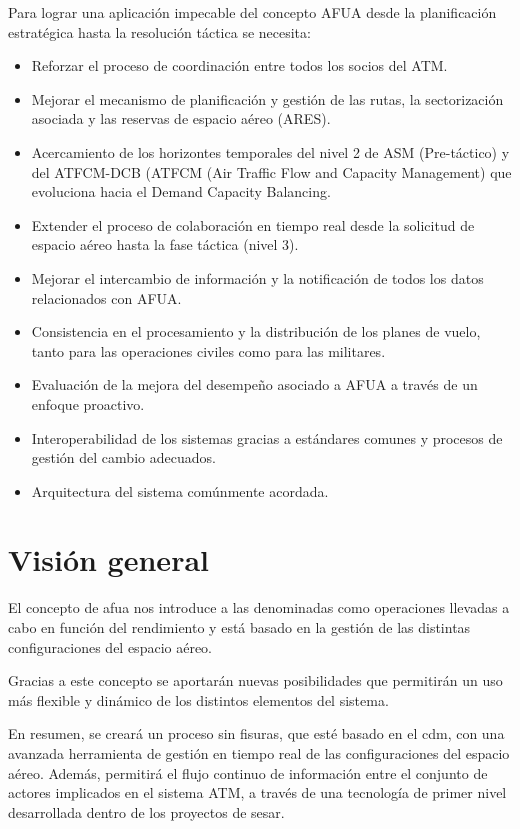 Para lograr una aplicación impecable del concepto AFUA desde la planificación estratégica hasta la resolución táctica se necesita:

\begin{itemize}
    \item Reforzar el proceso de coordinación entre todos los socios del ATM.
    \item Mejorar el mecanismo de planificación y gestión de las rutas, la sectorización asociada y las reservas de espacio aéreo (ARES).
    \item Acercamiento de los horizontes temporales del nivel 2 de ASM (Pre-táctico) y del ATFCM-DCB (ATFCM (Air Traffic Flow and Capacity Management) que evoluciona hacia el Demand Capacity Balancing.
    \item Extender el proceso de colaboración en tiempo real desde la solicitud de espacio aéreo hasta la fase táctica (nivel 3).
    \item Mejorar el intercambio de información y la notificación de todos los datos relacionados con AFUA.
    \item Consistencia en el procesamiento y la distribución de los planes de vuelo, tanto para las operaciones civiles como para las militares.
    \item Evaluación de la mejora del desempeño asociado a AFUA a través de un enfoque proactivo.
    \item Interoperabilidad de los sistemas gracias a estándares comunes y procesos de gestión del cambio adecuados.
    \item Arquitectura del sistema comúnmente acordada.
\end{itemize}

\section{Visión general}

El concepto de \acrfull{afua} nos introduce a las denominadas como operaciones llevadas a cabo en función del rendimiento y está basado en la gestión de las distintas configuraciones del espacio aéreo. 

Gracias a este concepto se aportarán nuevas posibilidades que permitirán un uso más flexible y dinámico de los distintos elementos del sistema. 

En resumen, se creará un proceso sin fisuras, que esté basado en el \acrfull{cdm}, con una avanzada herramienta de gestión en tiempo real de las configuraciones del espacio aéreo. Además, permitirá el flujo continuo de información entre el conjunto de actores implicados en el sistema ATM, a través de una tecnología de primer nivel desarrollada dentro de los proyectos de \acrfull{sesar}.


